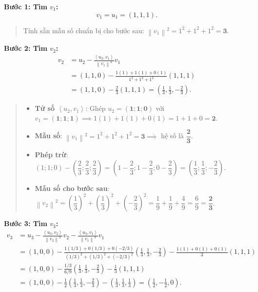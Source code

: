 \documentclass[12pt,a4paper]{article}
\newcommand{\ip}[2]{\left\langle #1,#2\right\rangle}
\newcommand{\norm}[1]{\left\|#1\right\|}
\begin{document}
\textbf{Bước 1: Tìm $v_1$:}
\[
v_1 = u_1 = (1, 1, 1).
\]

\begin{quote}
\small
\noindent{}\par\vspace{3pt}
Tính sẵn mẫu số chuẩn bị cho bước sau: $\norm{v_1}^2 = 1^2 + 1^2 + 1^2 = \mathbf{3}$.
\end{quote}

\vspace{0.2cm}
\textbf{Bước 2: Tìm $v_2$:}
\begin{align*}
v_2 &= u_2 - \frac{\ip{u_2}{v_1}}{\norm{v_1}^2}v_1 \\
    &= (1, 1, 0) - \frac{1(1) + 1(1) + 0(1)}{1^2 + 1^2 + 1^2}(1, 1, 1) \\
    &= (1, 1, 0) - \frac{2}{3}(1, 1, 1) = \left(\frac{1}{3}, \frac{1}{3}, -\frac{2}{3}\right).
\end{align*}

\begin{quote}
\small
\noindent{}\par\vspace{3pt}
\begin{itemize}[noitemsep,topsep=2pt]
\item \textbf{Tử số $\ip{u_2}{v_1}$}: Ghép $u_2 = (\mathbf{1}; \mathbf{1}; \mathbf{0})$ với $v_1 = (\mathbf{1}; \mathbf{1}; \mathbf{1}) \implies 1(1) + 1(1) + 0(1) = 1 + 1 + 0 = \mathbf{2}$.
\item \textbf{Mẫu số}: $\norm{v_1}^2 = 1^2 + 1^2 + 1^2 = \mathbf{3} \implies$ hệ số là $\dfrac{\mathbf{2}}{\mathbf{3}}$.
\item \textbf{Phép trừ}: $(1; 1; 0) - \left(\dfrac{2}{3}; \dfrac{2}{3}; \dfrac{2}{3}\right) = \left(1-\dfrac{2}{3}; 1-\dfrac{2}{3}; 0-\dfrac{2}{3}\right) = \left(\dfrac{1}{3}; \dfrac{1}{3}; -\dfrac{2}{3}\right)$.
\item \textbf{Mẫu số cho bước sau}: $\norm{v_2}^2 = \left(\dfrac{1}{3}\right)^2 + \left(\dfrac{1}{3}\right)^2 + \left(-\dfrac{2}{3}\right)^2 = \dfrac{1}{9} + \dfrac{1}{9} + \dfrac{4}{9} = \dfrac{6}{9} = \mathbf{\dfrac{2}{3}}$.
\end{itemize}
\end{quote}

\vspace{0.2cm}
\textbf{Bước 3: Tìm $v_3$:}
\begin{align*}
v_3 &= u_3 - \frac{\ip{u_3}{v_2}}{\norm{v_2}^2}v_2 - \frac{\ip{u_3}{v_1}}{\norm{v_1}^2}v_1 \\
    &= (1, 0, 0) - \frac{1(1/3) + 0(1/3) + 0(-2/3)}{(1/3)^2 + (1/3)^2 + (-2/3)^2}\left(\frac{1}{3}, \frac{1}{3}, -\frac{2}{3}\right) - \frac{1(1) + 0(1) + 0(1)}{3}(1, 1, 1) \\
    &= (1, 0, 0) - \frac{1/3}{6/9}\left(\frac{1}{3}, \frac{1}{3}, -\frac{2}{3}\right) - \frac{1}{3}(1, 1, 1) \\
    &= (1, 0, 0) - \frac{1}{2}\left(\frac{1}{3}, \frac{1}{3}, -\frac{2}{3}\right) - \left(\frac{1}{3}, \frac{1}{3}, \frac{1}{3}\right) = \left(\frac{1}{2}, -\frac{1}{2}, 0\right).
\end{align*}
\end{document}
